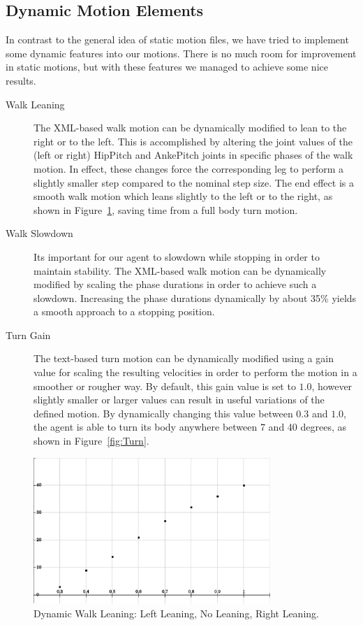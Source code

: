 \subsection{Dynamic Motion Elements}
In contrast to the general idea of static motion files, we have tried to implement some dynamic features into our motions. There is no much room for improvement in static motions, but with these features we managed to achieve some nice results.
\begin{description}
	\item[Walk Leaning] The XML-based walk motion can be dynamically modified to lean to the right or to the left. This is accomplished by altering the joint values of the (left or right) HipPitch and AnkePitch joints in specific phases of the walk motion. In effect, these changes force the corresponding leg to perform a slightly smaller step compared to the nominal step size. The end effect is a smooth walk motion which leans slightly to the left or to the right, as shown in Figure~\ref{fig:Lean}, saving time from a full body turn motion.
	\item[Walk Slowdown] Its important for our agent to slowdown while stopping in order to maintain stability. The XML-based walk motion can be dynamically modified by scaling the phase durations in order to achieve such a slowdown. Increasing the phase durations dynamically by about 35\% yields a smooth approach to a stopping position. 
	\item[Turn Gain] The text-based turn motion can be dynamically modified using a gain value for scaling the resulting velocities in order to perform the motion in a smoother or rougher way. By default, this gain value is set to $1.0$, however slightly smaller or larger values can result in useful variations of the defined motion. By dynamically changing this value between $0.3$ and $1.0$, the agent is able to turn its body anywhere between 7 and 40 degrees, as shown in Figure~\ref{fig:Turn}.
\end{description} 

\begin{figure}[t!]
\centering
  \includegraphics[width=0.8\textwidth]{Chapter3/figures/DynamicTurn.pdf}
  \caption{Dynamic Walk Leaning: Left Leaning, No Leaning, Right Leaning.}
  \label{fig:Lean}
\end{figure}


